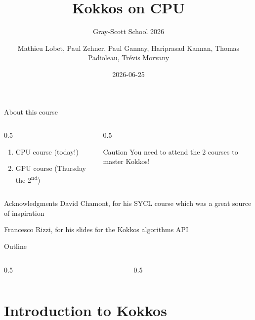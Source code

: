 \documentclass[
    aspectratio=169,
]{beamer}
\title{Kokkos on CPU}
\subtitle{Gray-Scott School 2026}
\author{Mathieu Lobet, Paul Zehner, Paul Gannay, Hariprasad Kannan, Thomas Padioleau, Trévis Morvany}
\institute{CEA}
\date{2026-06-25}
\begin{document}
\begin{frame}[plain]
    \titlepage
\end{frame}

\begin{frame}{About this course}
    \begin{columns}
        \begin{column}{0.5\linewidth}
            \begin{enumerate}
                \item CPU course (today!)
                \item GPU course (Thursday the 2\textsuperscript{nd})
            \end{enumerate}
        \end{column}
        \pause
        \begin{column}{0.5\linewidth}
            \begin{alertblock}{Caution}
                You need to attend the 2 courses to master Kokkos!
            \end{alertblock}
        \end{column}
    \end{columns}
\end{frame}

\begin{frame}{Acknowledgments}
    David Chamont, for his SYCL course which was a great source of inspiration

    \vspace{1em}

    Francesco Rizzi, for his slides for the Kokkos algorithms API
\end{frame}

\begin{frame}{Outline}
    \begin{columns}
        \begin{column}{0.5\linewidth}
            \tableofcontents[sections=1-9]
        \end{column}
        \begin{column}{0.5\linewidth}
            \tableofcontents[sections=10-16]
        \end{column}
    \end{columns}
\end{frame}

\section{Introduction to Kokkos}
\end{document}
